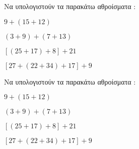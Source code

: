 Να υπολογιστούν τα παρακάτω αθροίσματα :
\begin{rlist}
\item $ 9+(15+12) $
\item $ (3+9)+(7+13) $
\item $ [(25+17)+8]+21 $
\item $ [27+(22+34)+17]+9 $
\end{rlist}
Να υπολογιστούν τα παρακάτω αθροίσματα :
\begin{rlist}
\item $ 9+(15+12) $
\item $ (3+9)+(7+13) $
\item $ [(25+17)+8]+21 $
\item $ [27+(22+34)+17]+9 $
\end{rlist}
